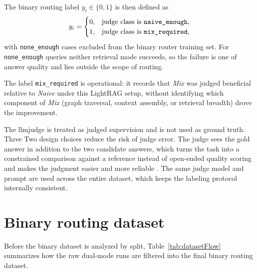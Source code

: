 \documentclass[english, bibtex]{kththesis}               %
\numberwithin{listing}{chapter}
\providecommand{\DIFaddtex}[1]{{\protect\color{blue} \sf #1}} %
\providecommand{\DIFdeltex}[1]{{\protect\color{red} \scriptsize #1}} %
\providecommand{\DIFaddbegin}{} %
\providecommand{\DIFaddend}{} %
\providecommand{\DIFdelbegin}{} %
\providecommand{\DIFdelend}{} %
\providecommand{\DIFadd}[1]{\texorpdfstring{\DIFaddtex{#1}}{#1}} %
\providecommand{\DIFdel}[1]{\texorpdfstring{\DIFdeltex{#1}}{}} %
\begin{document}
The binary routing label \(y_i \in \{0, 1\}\) is then defined as
\begin{equation}
\label{eq:routingLabel}
y_i =
\begin{cases}
0, & \text{judge class is \texttt{naive\_enough},}\\
1, & \text{judge class is \texttt{mix\_required},}
\end{cases}
\end{equation}
with \texttt{none\_enough} cases excluded from the binary router training set. For \texttt{none\_enough} queries neither retrieval mode succeeds, so the failure is one of answer quality and lies outside the scope of routing.

The label \texttt{mix\_required} is operational: it records that \emph{Mix} was judged beneficial relative to \emph{Naive} under this LightRAG setup, without identifying which component of \emph{Mix} (graph traversal, context assembly, or retrieval breadth) drove the improvement.

The \gls{llmjudge} is treated as judged supervision and is not used as ground truth. \DIFdelbegin \DIFdel{Three }\DIFdelend \DIFaddbegin \DIFadd{Two }\DIFaddend design choices reduce the risk of judge error. The judge sees the gold answer in addition to the two candidate answers, which turns the task into a constrained comparison against a reference instead of open-ended quality scoring and makes the judgment easier and more reliable \cite{zheng2023judge}. The same judge model and prompt are used across the entire dataset, which keeps the labeling protocol internally consistent.

\section{Binary routing dataset}
\label{sec:methodDataset}

Before the binary dataset is analyzed by split, Table~\ref{tab:datasetFlow} summarizes how the raw dual-mode runs are filtered into the final binary routing dataset.
\end{document}
